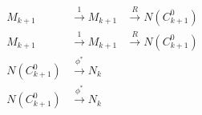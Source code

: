 $$
\begin{array}{ccc}
M_{k+1} & \xrightarrow{1} M_{k+1} & \xrightarrow{R} N(C_{k+1}^0) \\
M_{k+1} & \xrightarrow{1} M_{k+1} & \xrightarrow{R} N(C_{k+1}^0) \\
N(C_{k+1}^0) & \xrightarrow{\phi^*} N_k \\
N(C_{k+1}^0) & \xrightarrow{\phi^*} N_k
\end{array}
$$
